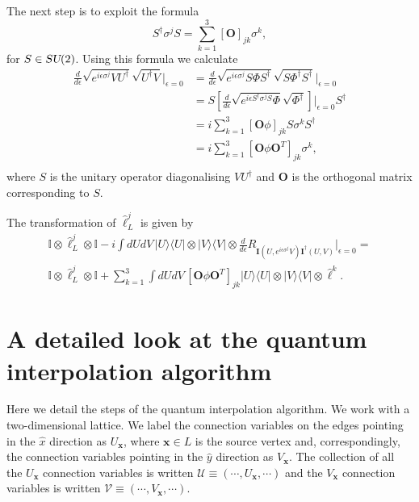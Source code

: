 \documentclass[12pt]{amsart}
\def\su2{\textsl{SU}(2)}
\theoremstyle{definition}
\theoremstyle{remark}
\numberwithin{equation}{section}
\begin{document}
The next step is to exploit the formula
\begin{equation}
	S^\dag \sigma^{j} S = \sum_{k = 1}^3 [\mathbf{O}]_{jk} \sigma^k,
\end{equation}
for $S \in \su2$. Using this formula we calculate
\begin{equation}
	\begin{split}
	\frac{d}{d\epsilon}\sqrt{e^{i\epsilon \sigma^j} VU^\dag}\sqrt{U^\dag V}\bigg|_{\epsilon =0} &= \frac{d}{d\epsilon}\sqrt{e^{i\epsilon \sigma^j} S \Phi S^\dag}\sqrt{S \Phi^\dag S^\dag}\bigg|_{\epsilon =0} \\
	&= S\left[\frac{d}{d\epsilon}\sqrt{e^{i\epsilon S^\dag \sigma^j S}  \Phi }\sqrt{ \Phi^\dag }\right]\bigg|_{\epsilon =0} S^\dag \\
	&= i \sum_{k=1}^3 [\mathbf{O} \phi ]_{jk}  S\sigma^k S^\dag \\
	&= i \sum_{k=1}^3 [\mathbf{O} \phi \mathbf{O}^T]_{jk}  \sigma^k, \\
	\end{split}
\end{equation}
where $S$ is the unitary operator diagonalising $VU^\dag$ and $\mathbf{O}$ is the orthogonal matrix corresponding to $S$.

The transformation of $\widehat{\ell}^j_L$ is given by
\begin{multline}
	\mathbb{I}\otimes \widehat{\ell}_L^{j}\otimes \mathbb{I}  -i\int dUdV \, |U\rangle\langle U| \otimes  |V\rangle\langle V| \otimes \frac{d}{d\epsilon} R_{\mathbf{I}(U,e^{i\epsilon \sigma^j}V) \mathbf{I}^\dag(U,V)}\bigg|_{\epsilon = 0} = \\
	\mathbb{I}\otimes \widehat{\ell}_L^{j}\otimes \mathbb{I} + \sum_{k=1}^3 \int dUdV \, [\mathbf{O} \phi \mathbf{O}^T]_{jk} |U\rangle\langle U| \otimes  |V\rangle\langle V| \otimes  \widehat{\ell}^k.
\end{multline}

\section{A detailed look at the quantum interpolation algorithm}
Here we detail the steps of the quantum interpolation algorithm. We work with a two-dimensional lattice. We label the connection variables on the edges pointing in the $\widehat{x}$ direction as $U_\mathbf{x}$, where $\mathbf{x}\in L$ is the source vertex and, correspondingly, the connection variables pointing in the $\widehat{y}$ direction as $V_\mathbf{x}$. The collection of all the $U_\mathbf{x}$ connection variables is written $\mathcal{U} \equiv (\cdots, U_\mathbf{x}, \cdots)$ and the $V_\mathbf{x}$ connection variables is written $\mathcal{V} \equiv (\cdots, V_\mathbf{x}, \cdots)$.
\end{document}
